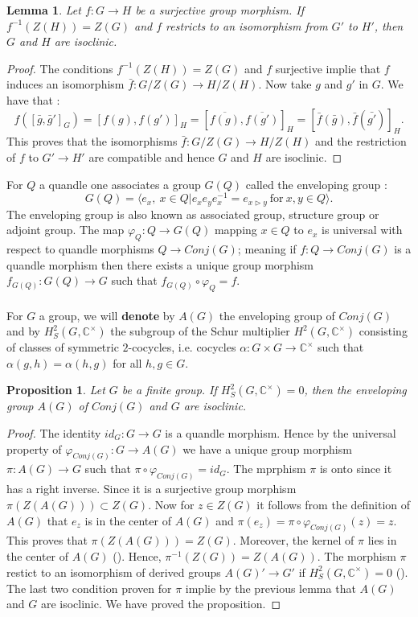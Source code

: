 \documentclass[12pt, reqno]{amsart}
\newtheorem{proposition}[theorem]{Proposition}
\newtheorem{lemma}[theorem]{Lemma}
\begin{document}
\begin{lemma}
Let $f: G \to H$ be a surjective group morphism. If $f^{-1}(Z(H))=Z(G)$ and $f$ restricts to an isomorphism from $G'$ to $H'$, then $G$ and $H$ are isoclinic.
\end{lemma}
\begin{proof}
The conditions $f^{-1}(Z(H))=Z(G)$ and $f$ surjective implie that $f$ induces an isomorphism $\bar{f}:G/Z(G)\to H/Z(H)$. Now take $g$ and $g'$ in $G$. We have that :
$$f([\bar{g},\bar{g}']_G)=[f(g),f(g')]_H=[\overline{f(g)},\overline{f(g')}]_H=[\bar{f}(\bar{g}),\bar{f}(\bar{g'})]_H.$$
This proves that the isomorphisms $\bar{f}: G/Z(G) \to H/Z(H)$ and the restriction of $f$ to $G'\to H'$ are compatible and hence $G$ and $H$ are isoclinic.
\end{proof}
For $Q$ a quandle one associates a group $G(Q)$ called the enveloping group :
$$G(Q)=\langle e_x ,\:x\in Q \vert e_xe_ye_x^{-1}=e_{x\triangleright y} \: \text{for} \: x,y \in Q \rangle.$$
The enveloping group is also known as associated group, structure group or adjoint group. The map $\varphi_Q : Q \to G(Q)$ mapping $x\in Q$ to $e_x$ is universal with respect to quandle morphisms $Q\to Conj(G)$; meaning if $f:Q \to Conj(G)$ is a quandle morphism then there exists a unique group morphism $f_{G(Q)}:G(Q)\to G$ such that $f_{G(Q)} \circ \varphi_Q=f$.\\\\
For $G$ a group, we will \textbf{denote} by $A(G)$ the enveloping group of $Conj(G)$ and by $H_S^2(G,\mathbb{C}^\times)$ the subgroup of the Schur multiplier $H^2(G,\mathbb{C}^\times)$ consisting of classes of symmetric $2$-cocycles, i.e. cocycles $\alpha :G\times G \to \mathbb{C}^\times$ such that $\alpha(g,h)=\alpha(h,g)$ for all $h,g \in G$.
\begin{proposition}
Let $G$ be a finite group. If $H^2_S(G,\mathbb{C}^\times)=0$, then the enveloping group $A(G)$ of $Conj(G)$ and $G$ are isoclinic.
\end{proposition}
\begin{proof}
The identity $id_G:G\to G$ is a quandle morphism. Hence by the universal property of $\varphi_{Conj(G)}:G \to A(G)$ we have a unique group morphism $\pi :A(G)\to G$ such that $\pi \circ \varphi_{Conj(G)}=id_G$. The mprphism $\pi$ is onto since it has a right inverse. Since it is a surjective group morphism $\pi(Z(A(G)))\subset Z(G)$. Now for $z\in Z(G)$ it follows from the definition of $A(G)$ that $e_z$ is in the center of $A(G)$ and $\pi(e_z)=\pi \circ \varphi_{Conj(G)}(z)=z$. This proves that $\pi(Z(A(G)))= Z(G)$. Moreover, the kernel of $\pi$ lies in the center of $A(G)$ (\cite{MM}). Hence, $\pi^{-1}(Z(G))=Z(A(G))$. The morphism $\pi$ restict to an isomorphism of derived groups $A(G)'\to G'$ if $H^2_S(G,\mathbb{C}^\times)=0$ (\cite{MM}). The last two condition proven for $\pi$ implie by the previous lemma that $A(G)$ and $G$ are isoclinic. We have proved the proposition.
\end{proof}
\end{document}
